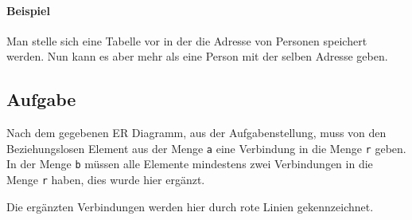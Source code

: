 \documentclass[11pt,a4paper,DIV=9]{scrartcl}
\newcounter{temp}
\newcommand{\aufgabe}[1]{
  \setcounter{temp}{\value{subsection}}
  \setcounter{subsection}{#1}
  \addtocounter{subsection}{-1}
  \subsection{Aufgabe}
  \setcounter{subsection}{\value{temp}}
}
\begin{document}
  \paragraph{Beispiel} Man stelle sich eine Tabelle vor in der die Adresse von Personen speichert werden. Nun kann es aber mehr als eine Person mit der selben Adresse geben.
\aufgabe{3}
  Nach dem gegebenen ER Diagramm, aus der Aufgabenstellung, muss von den Beziehungslosen Element aus der Menge \texttt{a} eine Verbindung in die Menge \texttt{r} geben. In der Menge \texttt{b} müssen alle Elemente mindestens zwei Verbindungen in die Menge \texttt{r} haben, dies wurde hier ergänzt.

  Die ergänzten Verbindungen werden hier durch rote Linien gekennzeichnet.
  \\

\end{document}
